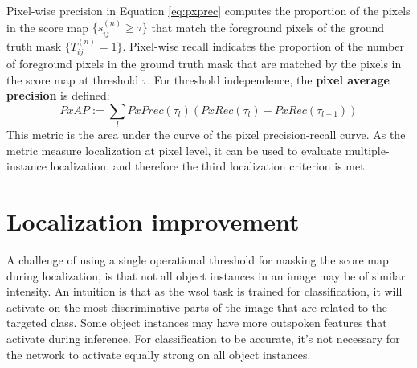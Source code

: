 Pixel-wise precision in Equation \ref{eq:pxprec} computes the proportion of the pixels in the score map $\{ s^{(n)}_{ij} \ge \tau \}$ that match the foreground pixels of the ground truth mask $\{ T^{(n)}_{ij} = 1 \}$. Pixel-wise recall indicates the proportion of the number of foreground pixels in the ground truth mask that are matched by the pixels in the score map at threshold $\tau$. For threshold independence, the \textbf{pixel average precision} is defined:
\begin{equation}
    PxAP := \sum_{l} PxPrec(\tau_{l})(PxRec(\tau_{l}) - PxRec(\tau_{l-1}))
\end{equation}
This metric is the area under the curve of the pixel precision-recall curve. As the metric measure localization at pixel level, it can be used to evaluate multiple-instance localization, and therefore the third localization criterion is met.

\section{Localization improvement} \label{sec:method_localization_improvement}
A challenge of using a single operational threshold for masking the score map during localization, is that not all object instances in an image may be of similar intensity. An intuition is that as the \acrshort{wsol} task is trained for classification, it will activate on the most discriminative parts of the image that are related to the targeted class. Some object instances may  have more outspoken features that activate during inference. For classification to be accurate, it's not necessary for the network to activate equally strong on all object instances.

